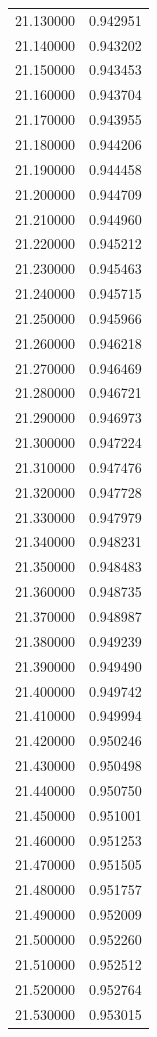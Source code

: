 \begin{tabular}{rr}
21.130000 & 0.942951 \\
21.140000 & 0.943202 \\
21.150000 & 0.943453 \\
21.160000 & 0.943704 \\
21.170000 & 0.943955 \\
21.180000 & 0.944206 \\
21.190000 & 0.944458 \\
21.200000 & 0.944709 \\
21.210000 & 0.944960 \\
21.220000 & 0.945212 \\
21.230000 & 0.945463 \\
21.240000 & 0.945715 \\
21.250000 & 0.945966 \\
21.260000 & 0.946218 \\
21.270000 & 0.946469 \\
21.280000 & 0.946721 \\
21.290000 & 0.946973 \\
21.300000 & 0.947224 \\
21.310000 & 0.947476 \\
21.320000 & 0.947728 \\
21.330000 & 0.947979 \\
21.340000 & 0.948231 \\
21.350000 & 0.948483 \\
21.360000 & 0.948735 \\
21.370000 & 0.948987 \\
21.380000 & 0.949239 \\
21.390000 & 0.949490 \\
21.400000 & 0.949742 \\
21.410000 & 0.949994 \\
21.420000 & 0.950246 \\
21.430000 & 0.950498 \\
21.440000 & 0.950750 \\
21.450000 & 0.951001 \\
21.460000 & 0.951253 \\
21.470000 & 0.951505 \\
21.480000 & 0.951757 \\
21.490000 & 0.952009 \\
21.500000 & 0.952260 \\
21.510000 & 0.952512 \\
21.520000 & 0.952764 \\
21.530000 & 0.953015 \\

\end{tabular}
